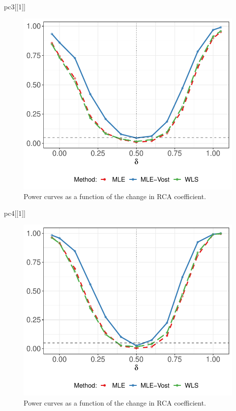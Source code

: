 \documentclass[
]{article}
\newenvironment{Shaded}{\begin{snugshade}}{\end{snugshade}}
\newcommand{\DecValTok}[1]{\textcolor[rgb]{0.00,0.00,0.81}{#1}}
\newcommand{\NormalTok}[1]{#1}
\begin{document}
\begin{Shaded}
\begin{Highlighting}[]
\NormalTok{pc3[[}\DecValTok{1}\NormalTok{]]}
\end{Highlighting}
\end{Shaded}

\begin{figure}
\centering
\includegraphics{paperCode_files/figure-latex/plotPowerCurves-3.pdf}
\caption{Power curves as a function of the change in RCA coefficient.}
\end{figure}

\begin{Shaded}
\begin{Highlighting}[]
\NormalTok{pc4[[}\DecValTok{1}\NormalTok{]]}
\end{Highlighting}
\end{Shaded}

\begin{figure}
\centering
\includegraphics{paperCode_files/figure-latex/plotPowerCurves-4.pdf}
\caption{Power curves as a function of the change in RCA coefficient.}
\end{figure}
\end{document}
